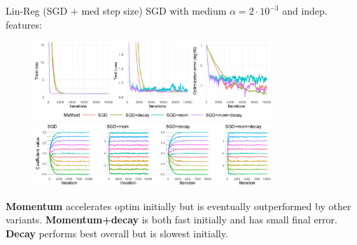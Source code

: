 \documentclass[11pt,compress,t,notes=noshow, xcolor=table]{beamer}
\begin{document}
\begin{vbframe}{Lin-Reg (SGD + med step size)}
\vspace{-0.4cm}
SGD with medium $\alpha=2\cdot10^{-3}$ and indep. features:
\begin{figure}
            \includegraphics[width=0.8\textwidth]{slides/04-multivariate-first-order/figure_man/simu_linmod/SGD_reg_med_lr_iters.pdf} \\
             \includegraphics[width=0.8\textwidth]{slides/04-multivariate-first-order/figure_man/simu_linmod/SGD_reg_coef_med.pdf}\\
            \begin{footnotesize}
            \end{footnotesize}
\end{figure}
\textbf{Momentum} accelerates optim initially but is eventually outperformed by other variants. \textbf{Momentum+decay} is both fast initially and has small final error. \textbf{Decay} performs best overall but is slowest initially.
\end{vbframe}
\end{document}
